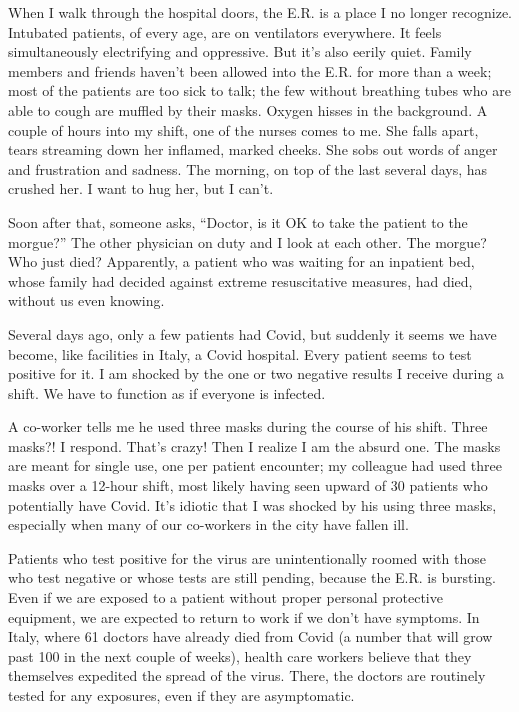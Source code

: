 When I walk through the hospital doors, the E.R. is a place I no longer
recognize. Intubated patients, of every age, are on ventilators
everywhere. It feels simultaneously electrifying and oppressive. But
it's also eerily quiet. Family members and friends haven't been allowed
into the E.R. for more than a week; most of the patients are too sick to
talk; the few without breathing tubes who are able to cough are muffled
by their masks. Oxygen hisses in the background. A couple of hours into
my shift, one of the nurses comes to me. She falls apart, tears
streaming down her inflamed, marked cheeks. She sobs out words of anger
and frustration and sadness. The morning, on top of the last several
days, has crushed her. I want to hug her, but I can't.

Soon after that, someone asks, ``Doctor, is it OK to take the patient to
the morgue?'' The other physician on duty and I look at each other. The
morgue? Who just died? Apparently, a patient who was waiting for an
inpatient bed, whose family had decided against extreme resuscitative
measures, had died, without us even knowing.

Several days ago, only a few patients had Covid, but suddenly it seems
we have become, like facilities in Italy, a Covid hospital. Every
patient seems to test positive for it. I am shocked by the one or two
negative results I receive during a shift. We have to function as if
everyone is infected.

A co-worker tells me he used three masks during the course of his shift.
Three masks?! I respond. That's crazy! Then I realize I am the absurd
one. The masks are meant for single use, one per patient encounter; my
colleague had used three masks over a 12-hour shift, most likely having
seen upward of 30 patients who potentially have Covid. It's idiotic that
I was shocked by his using three masks, especially when many of our
co-workers in the city have fallen ill.

Patients who test positive for the virus are unintentionally roomed with
those who test negative or whose tests are still pending, because the
E.R. is bursting. Even if we are exposed to a patient without proper
personal protective equipment, we are expected to return to work if we
don't have symptoms. In Italy, where 61 doctors have already died from
Covid (a number that will grow past 100 in the next couple of weeks),
health care workers believe that they themselves expedited the spread of
the virus. There, the doctors are routinely tested for any exposures,
even if they are asymptomatic.

